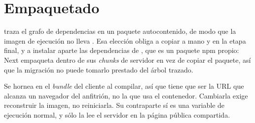 \section{Empaquetado}

 traza el grafo de dependencias en un paquete
autocontenido, de modo que la imagen de ejecución no lleva .
Esa elección obliga a copiar a mano  y  en la
etapa final, y a instalar aparte las dependencias de ,
que es un paquete npm propio: Next empaqueta  dentro de sus
\emph{chunks} de servidor en vez de copiar el paquete, así que la migración no
puede tomarlo prestado del árbol trazado.

\begin{pkwarn}
Se hornea en el \emph{bundle} del cliente al compilar, así que tiene que ser la
URL que alcanza un navegador del anfitrión, no la que usa el contenedor.
Cambiarla exige reconstruir la imagen, no reiniciarla. Su contraparte
 sí es una variable de ejecución normal, y sólo la lee
el servidor en la página pública compartida.
\end{pkwarn}
